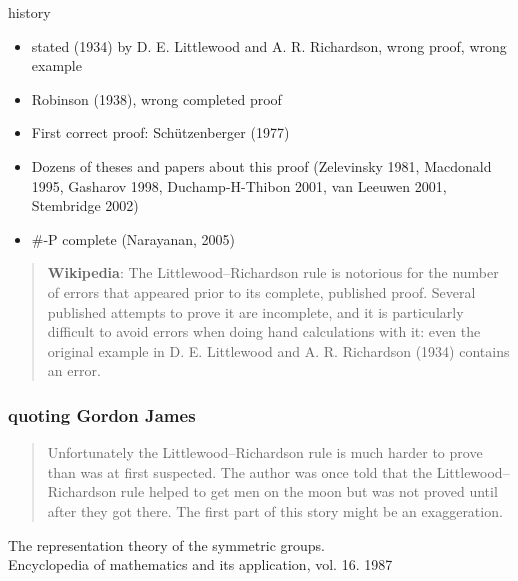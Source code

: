 \documentclass{beamer}
\begin{document}
\begin{frame}{history}
  \begin{itemize}
  \item stated (1934) by D. E. Littlewood and A. R. Richardson, wrong proof,
    wrong example
  \item Robinson (1938), wrong completed proof
  \item First correct proof: Schützenberger (1977)
  \item Dozens of theses and papers about this proof (Zelevinsky 1981, Macdonald
    1995, Gasharov 1998, Duchamp-H-Thibon 2001, van Leeuwen 2001, Stembridge
    2002)
  \item \#-P complete (Narayanan, 2005)
  \end{itemize}

  \begin{quotation}\small
    \textbf{Wikipedia}: The Littlewood–Richardson rule is notorious for the
    number of errors that appeared prior to its complete, published
    proof. Several published attempts to prove it are incomplete, and it is
    particularly difficult to avoid errors when doing hand calculations with
    it: even the original example in D. E. Littlewood and A. R. Richardson
    (1934) contains an error.
 \end{quotation}
\end{frame}

\begin{frame}\frametitle{quoting Gordon James}
  \begin{quote}
    Unfortunately the Littlewood–Richardson rule is much harder to
    prove than was at first suspected. The author was once told that
    the Littlewood–Richardson rule helped to get men on the moon but
    was not proved until after they got there.
    The first part of this story might be
    an exaggeration.
  \end{quote}


  \bigskip\small\begin{flushright}
    The representation theory of the symmetric
    groups. \\
    Encyclopedia of mathematics and its application,
    vol. 16. 1987
  \end{flushright}
\end{frame}
\end{document}
